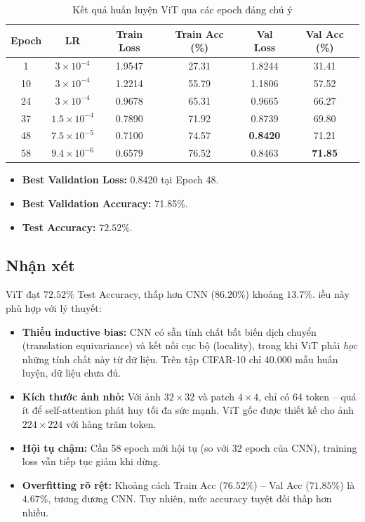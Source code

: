 \documentclass[a4paper]{article}
\theoremstyle{definition}
\begin{document}
\begin{table}[H]
	\centering
	\caption{Kết quả huấn luyện ViT qua các epoch đáng chú ý}
	\footnotesize
	\begin{tabular}{|c|c|c|c|c|c|}
		\hline
		\textbf{Epoch} & \textbf{LR} & \textbf{Train Loss} & \textbf{Train Acc (\%)} & \textbf{Val Loss} & \textbf{Val Acc (\%)} \\ \hline
		1   & $3 \times 10^{-4}$       & 1.9547 & 27.31 & 1.8244 & 31.41 \\ \hline
		10  & $3 \times 10^{-4}$       & 1.2214 & 55.79 & 1.1806 & 57.52 \\ \hline
		24  & $3 \times 10^{-4}$       & 0.9678 & 65.31 & 0.9665 & 66.27 \\ \hline
		37  & $1.5 \times 10^{-4}$     & 0.7890 & 71.92 & 0.8739 & 69.80 \\ \hline
		48  & $7.5 \times 10^{-5}$     & 0.7100 & 74.57 & \textbf{0.8420} & 71.21 \\ \hline
		58  & $9.4 \times 10^{-6}$     & 0.6579 & 76.52 & 0.8463 & \textbf{71.85} \\ \hline
	\end{tabular}
	\label{tab:vit-results}
\end{table}

\begin{itemize}
	\item \textbf{Best Validation Loss:} 0.8420 tại Epoch 48.
	\item \textbf{Best Validation Accuracy:} 71.85\%.
	\item \textbf{Test Accuracy:} $\mathbf{72.52\%}$.
\end{itemize}

\subsection{Nhận xét}
ViT đạt $72.52\%$ Test Accuracy, thấp hơn CNN ($86.20\%$) khoảng $13.7\%$. \DJ iều này phù hợp với lý thuyết:

\begin{itemize}
	\item \textbf{Thiếu inductive bias:} CNN có sẵn tính chất bất biến dịch chuyển (translation equivariance) và kết nối cục bộ (locality), trong khi ViT phải \textit{học} những tính chất này từ dữ liệu. Trên tập CIFAR-10 chỉ 40.000 mẫu huấn luyện, dữ liệu chưa đủ.
	\item \textbf{Kích thước ảnh nhỏ:} Với ảnh $32 \times 32$ và patch $4 \times 4$, chỉ có 64 token -- quá ít để self-attention phát huy tối đa sức mạnh. ViT gốc được thiết kế cho ảnh $224 \times 224$ với hàng trăm token.
	\item \textbf{Hội tụ chậm:} Cần 58 epoch mới hội tụ (so với 32 epoch của CNN), training loss vẫn tiếp tục giảm khi dừng.
	\item \textbf{Overfitting rõ rệt:} Khoảng cách Train Acc ($76.52\%$) -- Val Acc ($71.85\%$) là $4.67\%$, tương đương CNN. Tuy nhiên, mức accuracy tuyệt đối thấp hơn nhiều.
\end{itemize}
\end{document}
